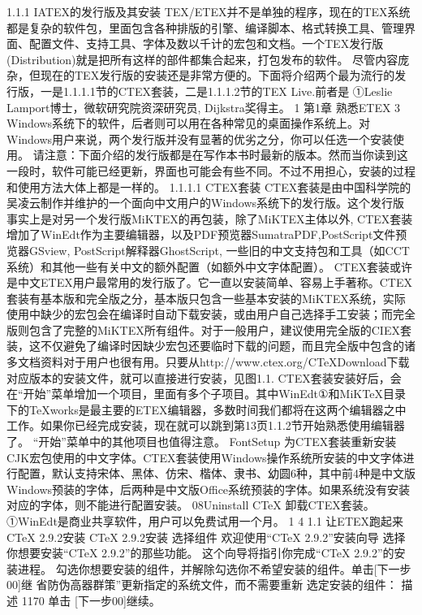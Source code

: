 \documentclass[UTF8]{ctexart}
\begin{document}
1.1.1 IATEX的发行版及其安装
TEX/ETEX并不是单独的程序，现在的TEX系统都是复杂的软件包，里面包含各种排版的引擎、编译脚本、格式转换工具、管理界面、配置文件、支持工具、字体及数以千计的宏包和文档。一个TEX发行版(Distribution)就是把所有这样的部件都集合起来，打包发布的软件。
尽管内容庞杂，但现在的TEX发行版的安装还是非常方便的。下面将介绍两个最为流行的发行版，一是1.1.1.1节的CTEX套装，二是1.1.1.2节的TEX Live.前者是
①Leslie Lamport博士，微软研究院资深研究员, Dijkstra奖得主。
1
第1章	熟悉ETEX	3
Windows系统下的软件，后者则可以用在各种常见的桌面操作系统上。对Windows用户来说，两个发行版并没有显著的优劣之分，你可以任选一个安装使用。
请注意：下面介绍的发行版都是在写作本书时最新的版本。然而当你读到这一段时，软件可能已经更新，界面也可能会有些不同。不过不用担心，安装的过程和使用方法大体上都是一样的。
1.1.1.1 CTEX套装
CTEX套装是由中国科学院的吴凌云制作并维护的一个面向中文用户的Windows系统下的发行版。这个发行版事实上是对另一个发行版MiKTEX的再包装，除了MiKTEX主体以外, CTEX套装增加了WinEdt作为主要编辑器，以及PDF预览器SumatraPDF,PostScript文件预览器GSview, PostScript解释器GhostScript, 一些旧的中文支持包和工具（如CCT系统）和其他一些有关中文的额外配置（如额外中文字体配置）。
CTEX套装或许是中文ETEX用户最常用的发行版了。它一直以安装简单、容易上手著称。CTEX套装有基本版和完全版之分，基本版只包含一些基本安装的MiKTEX系统，实际使用中缺少的宏包会在编译时自动下载安装，或由用户自己选择手工安装；而完全版则包含了完整的MiKTEX所有组件。对于一般用户，建议使用完全版的CIEX套装，这不仅避免了编译时因缺少宏包还要临时下载的问题，而且完全版中包含的诸多文档资料对于用户也很有用。只要从http://www.ctex.org/CTeXDownload下载对应版本的安装文件，就可以直接进行安装，见图1.1.
CTEX套装安装好后，会在“开始”菜单增加一个项目，里面有多个子项目。其中WinEdt①和MiKTeX目录下的TeXworks是最主要的ETEX编辑器，多数时间我们都将在这两个编辑器之中工作。如果你已经完成安装，现在就可以跳到第13页1.1.2节开始熟悉使用编辑器了。
“开始”菜单中的其他项目也值得注意。
FontSetup
为CTEX套装重新安装CJK宏包使用的中文字体。CTEX套装使用Windows操作系统所安装的中文字体进行配置，默认支持宋体、黑体、仿宋、楷体、隶书、幼圆6种，其中前4种是中文版Windows预装的字体，后两种是中文版Office系统预装的字体。如果系统没有安装对应的字体，则不能进行配置安装。
08Uninstall CTeX
卸载CTEX套装。
①WinEdt是商业共享软件，用户可以免费试用一个月。
1
4	1.1	让ETEX跑起来
CTeX 2.9.2安装
CTeX 2.9.2安装
选择组件
欢迎使用“CTeX 2.9.2”安装向导
选择你想要安装“CTeX 2.9.2”的那些功能。
这个向导将指引你完成“CTeX 2.9.2”的安装进程。
勾选你想要安装的组件，并解除勾选你不希望安装的组件。单击[下一步00]继
省防伪高器群策”更新指定的系统文件，而不需要重新
选定安装的组件：
描述
1170
单击 [下一步00]继续。
\end{document}
